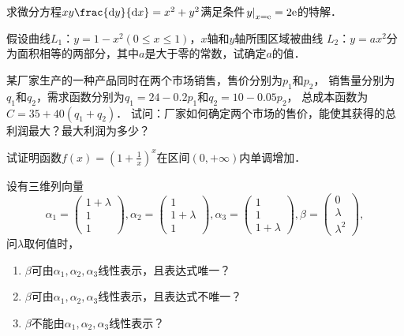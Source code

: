 \documentclass[plain,noanswer,medmath]{../../template/jnuexam}
\begin{document}
\begin{problem}
求微分方程$xy\frac{\dy}{\dx} = x^2 + y^2$满足条件$\left. y \right|_{x = \mathrm{e}} = 2\mathrm{e}$的特解．
\end{problem}



\begin{problem}
假设曲线$L_1$：$y = 1 - x^2\left(0 \le x \le 1 \right)$，$x$轴和$y$轴所围区域被曲线
$L_2$：$y = ax^2$分为面积相等的两部分，其中$a$是大于零的常数，试确定$a$的值．
\end{problem}



\begin{problem}
某厂家生产的一种产品同时在两个市场销售，售价分别为$p_1$和$p_2$，
销售量分别为$q_1$和$q_2$，需求函数分别为$q_1 = 24 - 0.2p_1$和$q_2 = 10 - 0.05p_2$，
总成本函数为$C = 35 + 40\left(q_1 + q_2 \right)$．
试问：厂家如何确定两个市场的售价，能使其获得的总利润最大？最大利润为多少？
\end{problem}



\begin{problem}
试证明函数$f(x) = \left(1 + \frac{1}{x} \right)^x$在区间$(0, +\infty)$内单调增加．
\end{problem}



\begin{problem}
设有三维列向量
$$\alpha_1 = \begin{pmatrix}
  1 + \lambda \\
  1 \\
  1
\end{pmatrix},\alpha_2 = \begin{pmatrix}
  1 \\
  1 + \lambda \\
  1
\end{pmatrix},\alpha_3 = \begin{pmatrix}
  1 \\
  1 \\
  1 + \lambda
\end{pmatrix},\beta = \begin{pmatrix}
  0 \\
  \lambda \\
  \lambda^2
\end{pmatrix},$$
问$\lambda$取何值时，
\begin{enumerate}
\item $\beta$可由$\alpha_1,\alpha_2,\alpha_3$线性表示，且表达式唯一？
\item $\beta$可由$\alpha_1,\alpha_2,\alpha_3$线性表示，且表达式不唯一？
\item $\beta$不能由$\alpha_1,\alpha_2,\alpha_3$线性表示？
\end{enumerate}
\end{problem}
\end{document}
